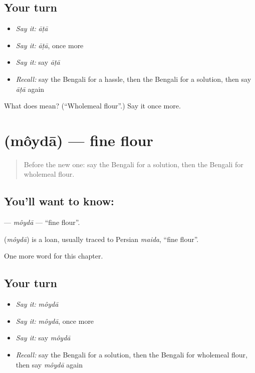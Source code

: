\subsection*{Your turn}
\begin{itemize}
\raggedright
  \item \emph{Say it:} \emph{āṭā}
  \item \emph{Say it:} \emph{āṭā}, once more
  \item \emph{Say it:} say \emph{āṭā}
  \item \emph{Recall:} say the Bengali for a hassle, then the Bengali for a solution, then say \emph{āṭā} again
\end{itemize}

\begin{tcolorbox}[breakable,colback=teal!4,colframe=teal!35!black,title={Before you move on}]
What does  mean? (\textquotedblleft{}Wholemeal flour\textquotedblright{}.) Say it once more.
\end{tcolorbox}
\section[\texorpdfstring{\bn{ময়দা} (môydā)}{ময়দা (môydā)}]{ (môydā) — fine flour}

\label{lesson:BN-C231-moyda}



\begin{quote}
Before the new one: say the Bengali for a solution, then the Bengali for wholemeal flour.
\end{quote}

\subsection*{You'll want to know: }
\textbf{} — \emph{môydā} — \textquotedblleft{}fine flour\textquotedblright{}.

\begin{cousinweb}
\textbf{} (\emph{môydā}) is a loan, usually traced to Persian \emph{maida}, \textquotedblleft{}fine flour\textquotedblright{}.
\end{cousinweb}

\begin{grammarlens}[title={What you've built}]
One more word for this chapter.
\end{grammarlens}

\subsection*{Your turn}
\begin{itemize}
\raggedright
  \item \emph{Say it:} \emph{môydā}
  \item \emph{Say it:} \emph{môydā}, once more
  \item \emph{Say it:} say \emph{môydā}
  \item \emph{Recall:} say the Bengali for a solution, then the Bengali for wholemeal flour, then say \emph{môydā} again
\end{itemize}

